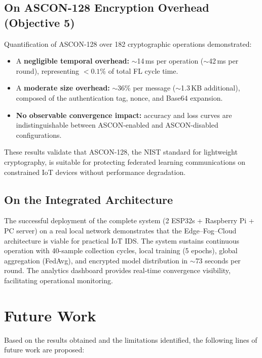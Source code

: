 \subsection{On ASCON-128 Encryption Overhead (Objective 5)}

Quantification of ASCON-128 over 182 cryptographic operations demonstrated:
\begin{itemize}
    \item A \textbf{negligible temporal overhead:} $\sim$14\,ms per operation ($\sim$42\,ms per round), representing $< 0.1$\% of total FL cycle time.
    \item A \textbf{moderate size overhead:} $\sim$36\% per message ($\sim$1.3\,KB additional), composed of the authentication tag, nonce, and Base64 expansion.
    \item \textbf{No observable convergence impact:} accuracy and loss curves are indistinguishable between ASCON-enabled and ASCON-disabled configurations.
\end{itemize}

These results validate that ASCON-128, the NIST standard for lightweight cryptography, is suitable for protecting federated learning communications on constrained IoT devices without performance degradation.

\subsection{On the Integrated Architecture}

The successful deployment of the complete system (2 ESP32s + Raspberry Pi + PC server) on a real local network demonstrates that the Edge--Fog--Cloud architecture is viable for practical IoT IDS. The system sustains continuous operation with 40-sample collection cycles, local training (5 epochs), global aggregation (FedAvg), and encrypted model distribution in $\sim$73 seconds per round. The analytics dashboard provides real-time convergence visibility, facilitating operational monitoring.

\section{Future Work}

Based on the results obtained and the limitations identified, the following lines of future work are proposed:

